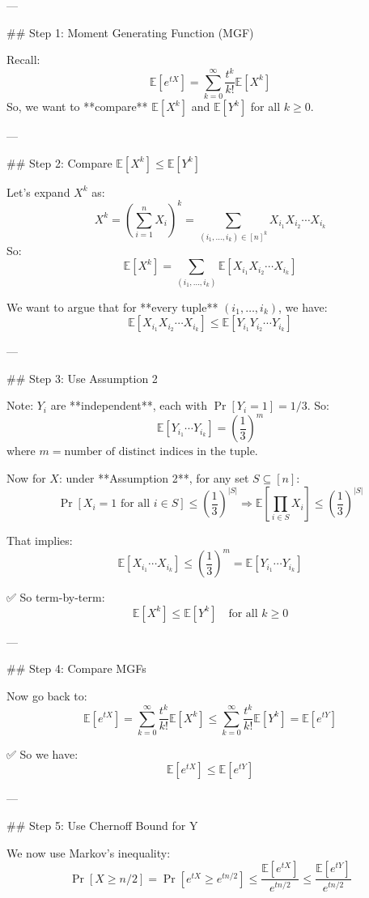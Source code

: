---

## Step 1: Moment Generating Function (MGF)

Recall:
\[
\mathbb{E}[e^{tX}] = \sum_{k=0}^\infty \frac{t^k}{k!} \mathbb{E}[X^k]
\]
So, we want to **compare** \( \mathbb{E}[X^k] \) and \( \mathbb{E}[Y^k] \) for all \( k \ge 0 \).

---

## Step 2: Compare \( \mathbb{E}[X^k] \le \mathbb{E}[Y^k] \)

Let's expand \( X^k \) as:
\[
X^k = \left(\sum_{i=1}^n X_i\right)^k = \sum_{(i_1, \dots, i_k) \in [n]^k} X_{i_1} X_{i_2} \cdots X_{i_k}
\]
So:
\[
\mathbb{E}[X^k] = \sum_{(i_1, \dots, i_k)} \mathbb{E}[X_{i_1} X_{i_2} \cdots X_{i_k}]
\]

We want to argue that for **every tuple** \( (i_1, \dots, i_k) \), we have:
\[
\mathbb{E}[X_{i_1} X_{i_2} \cdots X_{i_k}] \le \mathbb{E}[Y_{i_1} Y_{i_2} \cdots Y_{i_k}]
\]

---

## Step 3: Use Assumption 2

Note: \( Y_i \) are **independent**, each with \( \Pr[Y_i = 1] = 1/3 \). So:
\[
\mathbb{E}[Y_{i_1} \cdots Y_{i_k}] = \left(\frac{1}{3}\right)^m
\]
where \( m = \text{number of distinct indices in the tuple} \).

Now for \( X \): under **Assumption 2**, for any set \( S \subseteq [n] \):
\[
\Pr[X_i = 1 \text{ for all } i \in S] \le \left(\frac{1}{3}\right)^{|S|}
\Rightarrow \mathbb{E}\left[\prod_{i \in S} X_i\right] \le \left(\frac{1}{3}\right)^{|S|}
\]

That implies:
\[
\mathbb{E}[X_{i_1} \cdots X_{i_k}] \le \left(\frac{1}{3}\right)^m = \mathbb{E}[Y_{i_1} \cdots Y_{i_k}]
\]

✅ So term-by-term:  
\[
\mathbb{E}[X^k] \le \mathbb{E}[Y^k] \quad \text{for all } k \ge 0
\]

---

## Step 4: Compare MGFs

Now go back to:
\[
\mathbb{E}[e^{tX}] = \sum_{k=0}^\infty \frac{t^k}{k!} \mathbb{E}[X^k] \le \sum_{k=0}^\infty \frac{t^k}{k!} \mathbb{E}[Y^k] = \mathbb{E}[e^{tY}]
\]

✅ So we have:
\[
\mathbb{E}[e^{tX}] \le \mathbb{E}[e^{tY}]
\]

---

## Step 5: Use Chernoff Bound for Y

We now use Markov's inequality:
\[
\Pr[X \ge n/2] = \Pr[e^{tX} \ge e^{t n/2}] \le \frac{\mathbb{E}[e^{tX}]}{e^{t n/2}} \le \frac{\mathbb{E}[e^{tY}]}{e^{t n/2}}
\]


